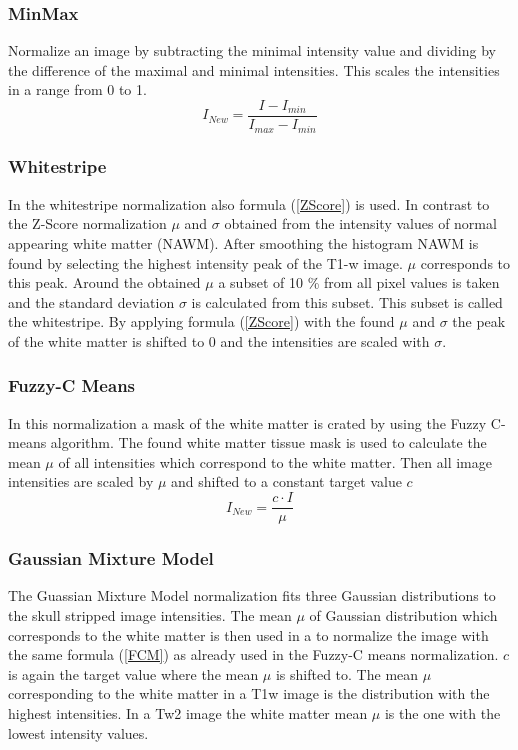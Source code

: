 \documentclass[journal]{IEEEtran}
\begin{document}
			\subsubsection{MinMax}
		Normalize an image by subtracting the minimal intensity value and dividing by the difference of the maximal and minimal intensities.
		This scales the intensities in a range from 0 to 1. 
			\begin{equation}
				I_{New} = \frac{I - I_{min}}{I_{max} - I_{min}}
			\end{equation}
		
		\subsubsection{Whitestripe}
		In the whitestripe normalization also formula (\ref{ZScore}) is used. In contrast to the Z-Score normalization $\mu$ and $\sigma$ obtained from the intensity
		values of normal appearing white matter (NAWM).  After smoothing the histogram NAWM is found by selecting the highest intensity peak of the T1-w image.
		$\mu$ corresponds to this peak. Around the obtained $\mu$ a subset of 10 \% from all pixel values is taken and the standard deviation $\sigma$ is calculated from this
		subset. This subset is called the whitestripe. By applying formula (\ref{ZScore}) with the found $\mu$ and  $\sigma$ the peak of the white matter is shifted to 0 and the intensities are scaled with $\sigma$.
		
		\subsubsection{Fuzzy-C Means} In this normalization a mask of the white matter is crated by using the Fuzzy C-means algorithm. 
		The found white matter tissue mask is used to calculate the mean $\mu$ of all intensities which correspond to the white matter. Then all image intensities are scaled by $\mu$ and shifted to a constant target value $c$
			\begin{equation}\label{FCM}
				I_{New} = \frac{c \cdot I}{\mu}
			\end{equation}

		\subsubsection{Gaussian Mixture Model}
		The Guassian Mixture Model normalization fits three Gaussian distributions to the skull stripped image intensities. The mean $\mu$ of Gaussian distribution which corresponds
		to the white matter is then used in a to normalize the image with the same formula (\ref{FCM}) as already used in the Fuzzy-C means normalization. $c$ is again the target value where the mean $\mu$ is shifted to. The mean $\mu$ corresponding to the white matter in a T1w image
		is the distribution with the highest intensities. In  a Tw2 image the white matter mean $\mu$ is the one with the lowest intensity values. 
		
\end{document}
